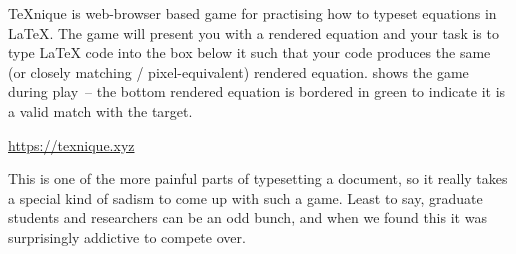 		

\TeX{}nique \cite{texnique} is web-browser based game for practising how to typeset equations in \LaTeX{}.
The game will present you with a rendered equation and your task is to type \LaTeX{} code into the box below it such that your code produces the same (or closely matching / pixel-equivalent) rendered equation.
 shows the game during play~-- the bottom rendered equation is bordered in green to indicate it is a valid match with the target. 

		\begin{center}
		{\small \url{https://texnique.xyz}}
		\end{center}
		
This is one of the more painful parts of typesetting a document, so it really takes a special kind of sadism to come up with such a game.
Least to say, graduate students and researchers can be an odd bunch, and when we found this it was surprisingly addictive to compete over. 

